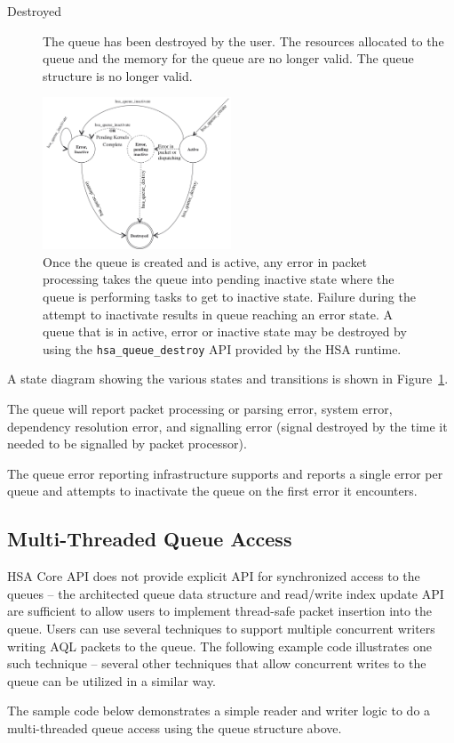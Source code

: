 \begin{description}
\item[Destroyed] The queue has been destroyed by the user.  The
resources allocated to the queue and the memory for the queue are no
longer valid. The queue structure is no longer valid. 
\end{description}

\begin{figure}
  \centering
  \includegraphics[width=0.5\textwidth] {queuestate}
  \centering
  \caption{Once the queue is created and is active, any error in
          packet processing takes the queue into pending inactive
          state where the queue is performing tasks to get to
          inactive state. Failure during the attempt to inactivate
          results in queue reaching an error state. A queue that is
          in active, error or inactive state may be destroyed by
          using the \texttt{hsa\_queue\_destroy} API provided by
  the HSA runtime.}
  \label{fig:queuestate}
\end{figure}

A state diagram showing the various states and transitions is shown
in Figure~\ref{fig:queuestate}.

The queue will report packet processing or parsing error, system
error, dependency resolution error, and signalling error (signal
destroyed by the time it needed to be signalled by packet processor).

The queue error reporting infrastructure supports and reports a
single error per queue and attempts to inactivate the queue on the
first error it encounters.

\hypertarget{coreapi_multithreading}{}\subsection{Multi-\/\-Threaded
Queue Access}\label{coreapi_multithreading}
H\-S\-A Core API does not provide explicit API for synchronized
access to the queues -- the architected queue data structure and
read/write index update API are
sufficient to allow users to implement thread-safe packet insertion
into the queue. Users can use several techniques to support
multiple concurrent writers writing AQL packets to the queue.  The
following example code illustrates one such technique -- several
other techniques that allow concurrent writes to the queue can be
utilized in a similar way.

The sample code below demonstrates a simple reader and writer logic
to do a multi-threaded queue access using the queue structure above.

\begin{framed}

\end{framed}

